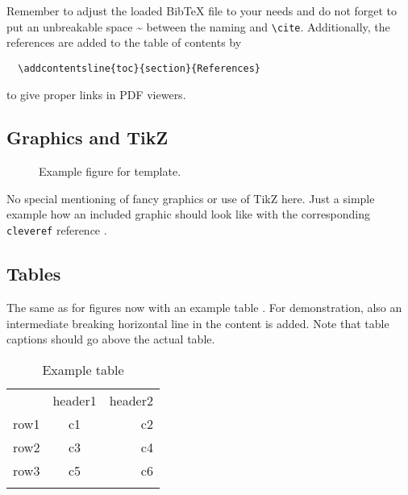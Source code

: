 \documentclass[%
  a4paper,
  twocolumn,
  colorlinks,
]{preprint}
\begin{document}
Remember to adjust the loaded BibTeX file to your needs and do not forget to
put an unbreakable space \~{} between the naming and \verb|\cite|.
Additionally, the references are added to the table of contents by
\begin{verbatim}
  \addcontentsline{toc}{section}{References}
\end{verbatim}
to give proper links in PDF viewers.


\subsection{Graphics and TikZ}%
\label{subsec:graphics}

\begin{figure}[t]
  \centering
   
  \caption{Example figure for template.}
  \label{fig:example}
\end{figure}

No special mentioning of fancy graphics or use of TikZ here.
Just a simple example how an included graphic should look like with the 
corresponding \verb|cleveref| reference .



\subsection{Tables}%
\label{subsec:tables}

The same as for figures now with an example table .
For demonstration, also an intermediate breaking horizontal line in the content 
is added.
Note that table captions should go above the actual table.

\begin{table}[t]
  \centering
  \caption{Example table}
  \label{tab:example}
  
  \begin{tabular}{lcr}
    \hline\noalign{\medskip}
    & header1 & header2\\
    \noalign{\smallskip}\hline\noalign{\medskip}
    row1 & c1 & c2 \\
    row2 & c3 & c4 \\
    \noalign{\smallskip}\hline\noalign{\medskip}
    row3 & c5 & c6 \\
    \noalign{\medskip}\hline\noalign{\smallskip}
  \end{tabular}
\end{table}
\end{document}
